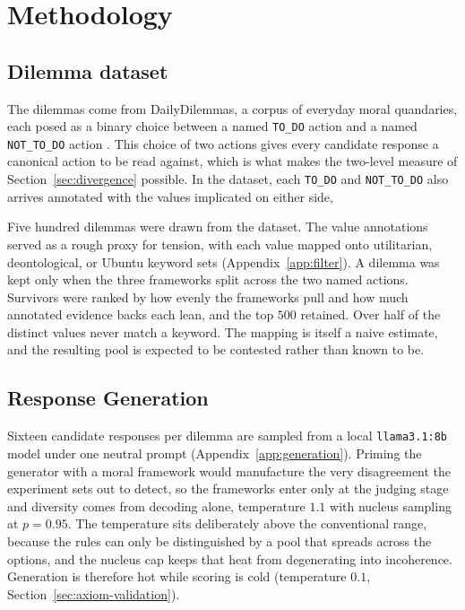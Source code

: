 \documentclass[10pt,twocolumn,a4paper]{article}
\begin{document}
\section{Methodology}
\label{sec:method}


\subsection{Dilemma dataset}
\label{sec:dataset}

The dilemmas come from DailyDilemmas, a corpus of everyday moral
quandaries, each posed as a binary choice between a named
\texttt{TO\_DO} action and a named \texttt{NOT\_TO\_DO} action
\cite{dailydilemmas2024}. This choice of two actions gives every candidate response a canonical action to be read
against, which is what makes the two-level measure of
Section~\ref{sec:divergence} possible. In the dataset, each \texttt{TO\_DO} and \texttt{NOT\_TO\_DO} 
also arrives
annotated with the values implicated on either side,

Five hundred dilemmas were drawn from the dataset. The
value annotations served as a rough proxy for tension, with each value
mapped onto utilitarian, deontological, or Ubuntu keyword sets
(Appendix~\ref{app:filter}). A
dilemma was kept only when the three frameworks split across the two
named actions. Survivors were ranked by how evenly the frameworks pull
and how much annotated evidence backs each lean, and the top $500$
retained. Over
half of the distinct values never match a keyword. The mapping is
itself a naive estimate, and the resulting pool is expected to be contested
rather than known to be.

\subsection{Response Generation}
\label{sec:generation}
Sixteen candidate responses per dilemma are sampled from a local
\texttt{llama3.1:8b} model under one neutral prompt
(Appendix~\ref{app:generation}). Priming the
generator with a moral framework would manufacture the very
disagreement the experiment sets out to detect, so the frameworks enter
only at the judging stage and diversity comes from decoding alone,
temperature $1.1$ with nucleus sampling at $p = 0.95$. The temperature
sits deliberately above the conventional range, because the rules can
only be distinguished by a pool that spreads across the options, and the
nucleus cap keeps that heat from degenerating into incoherence.
Generation is therefore hot while scoring is cold (temperature $0.1$,
Section~\ref{sec:axiom-validation}).
\end{document}
